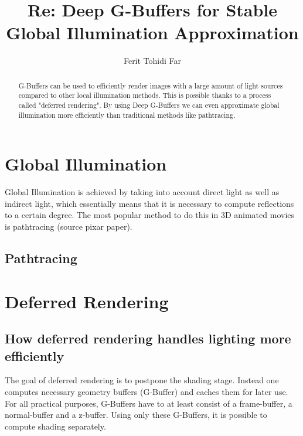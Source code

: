 \documentclass{ACGSeminar}
\begin{document}
\title{Re: Deep G-Buffers for Stable Global Illumination Approximation}

\author{Ferit Tohidi Far}

\maketitle


\begin{abstract}%
G-Buffers can be used to efficiently render images with a large amount of light sources compared to other local illumination methods. This is possible thanks to a 
process called "deferred rendering". By using Deep G-Buffers we can even approximate global illumination more efficiently than traditional methods like pathtracing. 
\end{abstract}

\tableofcontents

\newpage

\label{cha:introduction}
\section{Global Illumination}
	Global Illumination is achieved by taking into account direct light as well as indirect light, which essentially means that it is necessary to compute reflections to a
	certain degree. The most popular method to do this in 3D animated movies is pathtracing (source pixar paper).
	\subsection{Pathtracing}
		
\section{Deferred Rendering}
	\subsection{How deferred rendering handles lighting more efficiently}
	The goal of deferred rendering is to postpone the shading stage. Instead one computes necessary geometry buffers (G-Buffer) and caches them for later use.
	For all practical purposes, G-Buffers have to at least consist of a frame-buffer, a normal-buffer and a z-buffer. Using only these G-Buffers, it is possible
	to compute shading separately.
\end{document}
